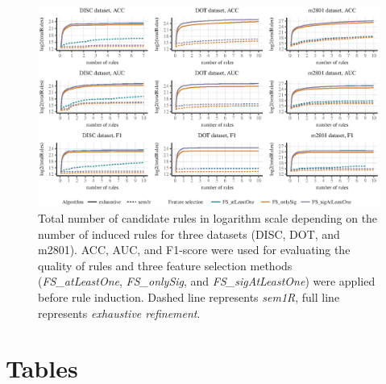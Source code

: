 \documentclass{bmcart}
\begin{document}
\begin{backmatter}
\begin{figure}[h!]
\caption{\csentence{} Total number of candidate rules in logarithm scale depending on the number of induced rules for three datasets (DISC, DOT, and m2801). ACC, AUC, and F1-score were used for evaluating the quality of rules and three feature selection methods (\emph{FS\_atLeastOne}, \emph{FS\_onlySig}, and \emph{FS\_sigAtLeastOne}) were applied before rule induction. Dashed line represents \emph{sem1R}, full line represents \emph{exhaustive refinement}.}
\label{fig:final_results_nodes}
\includegraphics{Fig6.eps}
\end{figure}


\section*{Tables}


\end{backmatter}
\end{document}
